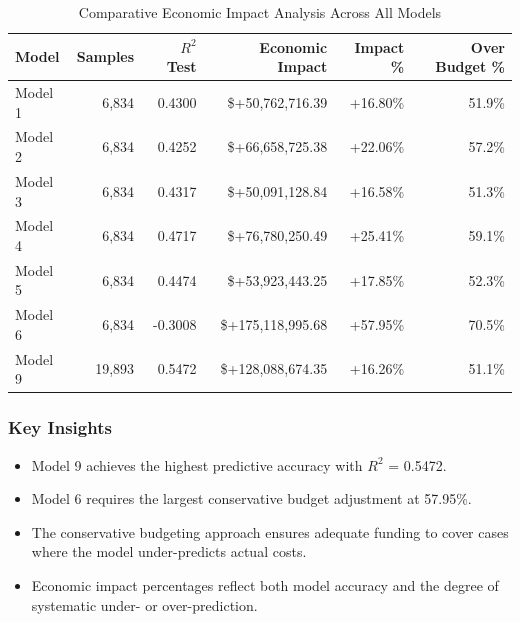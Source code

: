 \begin{table}[htbp]
\centering
\small
\caption{Comparative Economic Impact Analysis Across All Models}
\label{tab:all_models_impact_comparison}
\begin{tabular}{lrrrrr}
\toprule
\textbf{Model} & \textbf{Samples} & \textbf{$R^2$ Test} & \textbf{Economic Impact} & \textbf{Impact \%} & \textbf{Over Budget \%} \\
\midrule
Model 1 & 6,834 & 0.4300 & \$+50,762,716.39 & +16.80\% & 51.9\% \\
Model 2 & 6,834 & 0.4252 & \$+66,658,725.38 & +22.06\% & 57.2\% \\
Model 3 & 6,834 & 0.4317 & \$+50,091,128.84 & +16.58\% & 51.3\% \\
Model 4 & 6,834 & 0.4717 & \$+76,780,250.49 & +25.41\% & 59.1\% \\
Model 5 & 6,834 & 0.4474 & \$+53,923,443.25 & +17.85\% & 52.3\% \\
Model 6 & 6,834 & -0.3008 & \$+175,118,995.68 & +57.95\% & 70.5\% \\
Model 9 & 19,893 & 0.5472 & \$+128,088,674.35 & +16.26\% & 51.1\% \\
\bottomrule
\end{tabular}
\end{table}

\subsubsection{Key Insights}

\begin{itemize}
\item Model 9 achieves the highest predictive accuracy with $R^2$ = 0.5472.
\item Model 6 requires the largest conservative budget adjustment at 57.95\%.
\item The conservative budgeting approach ensures adequate funding to cover cases where the model under-predicts actual costs.
\item Economic impact percentages reflect both model accuracy and the degree of systematic under- or over-prediction.
\end{itemize}

